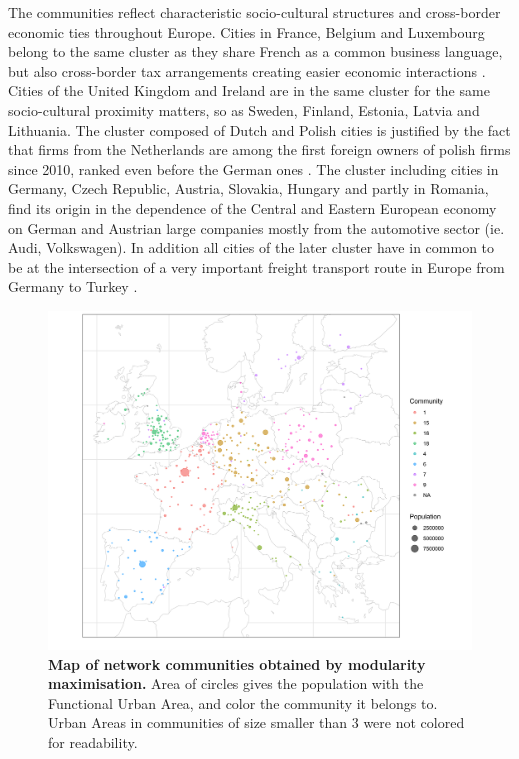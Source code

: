 \documentclass[10pt,letterpaper]{article}
\begin{document}
The communities reflect characteristic socio-cultural structures and cross-border economic ties throughout Europe. Cities in France, Belgium and Luxembourg belong to the same cluster as they share French as a common business language, but also cross-border tax arrangements creating easier economic interactions \cite{DecovilleDurand2019}. Cities of the United Kingdom and Ireland are in the same cluster for the same socio-cultural proximity matters, so as Sweden, Finland, Estonia, Latvia and Lithuania. The cluster composed of Dutch and Polish cities is justified by the fact that firms from the Netherlands are among the first foreign owners of polish firms since 2010, ranked even before the German ones \cite{2019arXiv191014652Z}. The cluster including cities in Germany, Czech Republic, Austria, Slovakia, Hungary and partly in Romania, find its origin in the dependence of the Central and Eastern European economy on German and Austrian large companies mostly from the automotive sector (ie. Audi, Volkswagen). In addition all cities of the later cluster have in common to be at the intersection of a very important freight transport route in Europe from Germany to Turkey \cite{Zdanowska2017}. 
\begin{figure}
    \begin{center}
    \includegraphics[width=\linewidth]{figures/Fig2.png}
    \end{center}
    \caption{{\bf Map of network communities obtained by modularity maximisation.} Area of circles gives the population with the Functional Urban Area, and color the community it belongs to. Urban Areas in communities of size smaller than 3 were not colored for readability.}
    \label{fig:fig2}
\end{figure}
\end{document}
